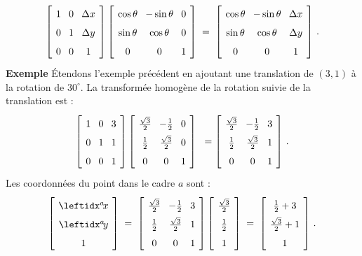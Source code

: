 \[
\spacearray
\left[\begin{array}{ccc}1&0&\Delta x\\0&1&\Delta y\\0&0&1\end{array}\right]
\left[\begin{array}{ccc}\cos\theta&-\sin\theta&0\\\sin\theta&\cos\theta&0\\0&0&1\end{array}\right]\;=\;
\left[\begin{array}{ccc}\cos\theta&-\sin\theta&\Delta x\\\sin\theta&\cos\theta&\Delta y\\0&0&1\end{array}\right]\,.
\]
\noindent\textbf{Exemple} Étendons l'exemple précédent en ajoutant une translation de $(3,1)$ à la rotation de $30^\circ$. La transformée homogène de la rotation suivie de la translation est :
\[
\spacearray
\left[\begin{array}{ccc}1&0&3\\0&1&1\\0&0&1\end{array}\right]
\left[\begin{array}{ccc}\frac{\sqrt{3}}{2}&-\frac{1}{2}&0\\\frac{1}{2}&\frac{\sqrt{3}}{2}&0\\0&0&1\end{array}\right]\;\;=
\left[\begin{array}{ccc}\frac{\sqrt{3}}{2}&-\frac{1}{2}&3\\\frac{1}{2}&\frac{\sqrt{3}}{2}&1\\0&0&1\end{array}\right]\,.
\]
Les coordonnées du point dans le cadre $a$ sont :
\[
\spacearray
\left[\begin{array}{c}\ax\\\ay\\1\end{array}\right]\;=\;
\left[\begin{array}{ccc}\frac{\sqrt{3}}{2}&-\frac{1}{2}&3\\\frac{1}{2}&\frac{\sqrt{3}}{2}&1\\0&0&1\end{array}\right]
\left[\begin{array}{c}\frac{\sqrt{3}}{2}\\\frac{1}{2}\\1\end{array}\right]\;=\;
\left[\begin{array}{c}\frac{1}{2}+3\\\frac{\sqrt{3}}{2}+1\\1\end{array}\right]\,.
\]

